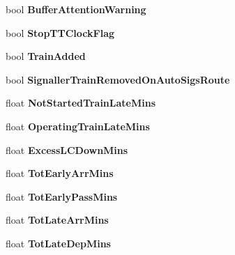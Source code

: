 \begin{DoxyCompactItemize}
\mbox{\label{class_t_train_controller_ada39cdbfadd136d813752252317f624f}} 
bool {\bfseries Buffer\+Attention\+Warning}
\item 
\mbox{\label{class_t_train_controller_a4cb4f95016d09ccf3007ede186474e09}} 
bool {\bfseries Stop\+T\+T\+Clock\+Flag}
\item 
\mbox{\label{class_t_train_controller_a646a91d8cedea54902a6fdc0ef67fff1}} 
bool {\bfseries Train\+Added}
\item 
\mbox{\label{class_t_train_controller_a39452a716da27a51a796b7e6a2bcad5b}} 
bool {\bfseries Signaller\+Train\+Removed\+On\+Auto\+Sigs\+Route}
\item 
\mbox{\label{class_t_train_controller_a095d7c99ffc21a6939a044bbad4fa18f}} 
float {\bfseries Not\+Started\+Train\+Late\+Mins}
\item 
\mbox{\label{class_t_train_controller_af25f4d9be4644eab1e042751b1738f98}} 
float {\bfseries Operating\+Train\+Late\+Mins}
\item 
\mbox{\label{class_t_train_controller_a2b18964f752a0241c45514b82c51e647}} 
float {\bfseries Excess\+L\+C\+Down\+Mins}
\item 
\mbox{\label{class_t_train_controller_a2904fbc7f4b39c555ea83b325f630d59}} 
float {\bfseries Tot\+Early\+Arr\+Mins}
\item 
\mbox{\label{class_t_train_controller_a464315be2825c7e4528b886b2da28bfb}} 
float {\bfseries Tot\+Early\+Pass\+Mins}
\item 
\mbox{\label{class_t_train_controller_afb22af38b090588a1334002fcf0c390e}} 
float {\bfseries Tot\+Late\+Arr\+Mins}
\item 
\mbox{\label{class_t_train_controller_a9692aa812b39b4c515e1599f63fd311c}} 
float {\bfseries Tot\+Late\+Dep\+Mins}
\item 

\end{DoxyCompactItemize}
